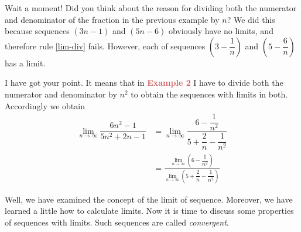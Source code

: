{\athr Wait a moment! Did you think about the reason for dividing both the numerator and denominator of the fraction in the previous example by $n$? We did this because sequences $(3 n - 1)$ and $(5n -	6)$	obviously have no limits, and therefore rule \eqref{lim-div} fails. However, each of
sequences $\left( 3 - \dfrac{1}{n} \right)$ and $\left( 5 - \dfrac{6}{n} \right)$ has a limit.

\rdr I have got your point. It means that in \textcolor{IndianRed}{\bf Example 2} I have to divide both the numerator and denominator by $n^{2}$ to obtain the sequences with limits in both. Accordingly we obtain
\begin{align*}%
\lim\limits_{n \to \infty} \dfrac{6n^{2} - 1}{5n^{2} +2n -1}  & = \lim\limits_{n \to \infty} \dfrac{6 - \dfrac{1}{n^{2}}}{5 + \dfrac{2}{n} - \dfrac{1}{n^{2}}} \\
& = \frac{\lim\limits_{n \to \infty} \left( 6 - \dfrac{1}{n^{2}}\right) }{\lim\limits_{n \to \infty} \left( 5 + \dfrac{2}{n	} - \dfrac{1}{n^{2}}\right)}
\end{align*}


\athr Well, we have examined the concept of the limit of sequence. Moreover, we have learned a little how to calculate limits. Now it is time to discuss some properties of sequences with limits. Such sequences are called \emph{convergent}.
}